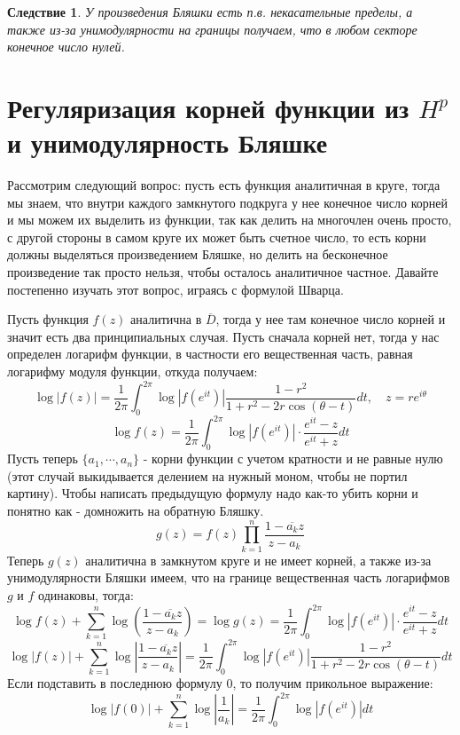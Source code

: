 \documentclass[12pt,a4paper]{article} %
\newtheorem{consequence}{Следствие}
\begin{document}
	\begin{consequence}
		У произведения Бляшки есть п.в. некасательные пределы, а также из-за унимодулярности на границы получаем, что в любом секторе конечное число нулей.
	\end{consequence}
	\section{Регуляризация корней функции из $H^p$ и унимодулярность Бляшке}
	Рассмотрим следующий вопрос: пусть есть функция аналитичная в круге, тогда мы знаем, что внутри каждого замкнутого подкруга у нее конечное число корней и мы можем их выделить из функции, так как делить на многочлен очень просто, с другой стороны в самом круге их может быть счетное число, то есть корни должны выделяться произведением Бляшке, но делить на бесконечное произведение так просто нельзя, чтобы осталось аналитичное частное. Давайте постепенно изучать этот вопрос, играясь с формулой Шварца.
	
	Пусть функция $f(z)$ аналитична в $\overline{D}$, тогда у нее там конечное число корней и значит есть два принципиальных случая. Пусть сначала корней нет, тогда у нас определен логарифм функции, в частности его вещественная часть, равная логарифму модуля функции, откуда получаем:
	$$\log |f(z)|=\frac{1}{2\pi}\int_0^{2\pi}\log|f(e^{it})|\frac{1-r^2}{1+r^2-2r\cos(\theta-t)}dt,\quad z=re^{i\theta}$$
	$$\log f(z)=\frac{1}{2\pi}\int_0^{2\pi}\log|f(e^{it})|\cdot\frac{e^{it}-z}{e^{it}+z}dt$$
	Пусть теперь $\{a_1,\cdots,a_n\}$ - корни функции с учетом кратности и не равные нулю (этот случай выкидывается делением на нужный моном, чтобы не портил картину). Чтобы написать предыдущую формулу надо как-то убить корни и понятно как - домножить на обратную Бляшку.
	$$g(z)=f(z)\prod_{k=1}^n\frac{1-\overline{a_k}z}{z-a_k}$$
	Теперь $g(z)$ аналитична в замкнутом круге и не имеет корней, а также из-за унимодулярности Бляшки имеем, что на границе вещественная часть логарифмов $g$ и $f$ одинаковы, тогда:
	$$\log f(z)+\sum_{k=1}^n\log\left(\frac{1-\overline{a_k}z}{z-a_k}\right)=\log g(z)=\frac{1}{2\pi}\int_0^{2\pi}\log|f(e^{it})|\cdot\frac{e^{it}-z}{e^{it}+z}dt$$
	$$\log |f(z)|+\sum_{k=1}^n\log\left|\frac{1-\overline{a_k}z}{z-a_k}\right|=\frac{1}{2\pi}\int_0^{2\pi}\log|f(e^{it})|\frac{1-r^2}{1+r^2-2r\cos(\theta-t)}dt$$
	Если подставить в последнюю формулу 0, то получим прикольное выражение:
	$$\log|f(0)|+\sum_{k=1}^n\log\left|\frac{1}{a_k}\right|=\frac{1}{2\pi}\int_0^{2\pi}\log|f(e^{it})|dt$$
	
\end{document}
